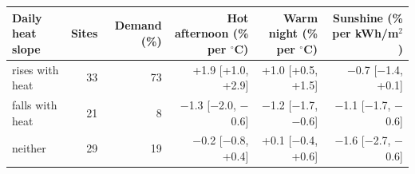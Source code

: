 \begin{tabular}{lrrrrr}
\toprule
Daily heat slope & Sites & Demand (\%) & Hot afternoon (\% per $^\circ$C) & Warm night (\% per $^\circ$C) & Sunshine (\% per kWh/m$^2$) \\
\midrule
rises with heat & 33 & 73 & +1.9 [+1.0, +2.9] & +1.0 [+0.5, +1.5] & $-$0.7 [$-$1.4, +0.1] \\
falls with heat & 21 & 8 & $-$1.3 [$-$2.0, $-$0.6] & $-$1.2 [$-$1.7, $-$0.6] & $-$1.1 [$-$1.7, $-$0.6] \\
neither & 29 & 19 & $-$0.2 [$-$0.8, +0.4] & +0.1 [$-$0.4, +0.6] & $-$1.6 [$-$2.7, $-$0.6] \\
\bottomrule
\end{tabular}
